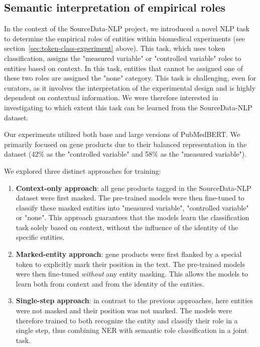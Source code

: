 \documentclass{bioinfo}
\begin{document}
\subsection{Semantic interpretation of empirical roles}\label{sec:results-roles}

In the context of the SourceData-NLP project, we introduced a novel NLP task to determine the empirical roles of entities within biomedical experiments (see section~\ref{sec:token-class-experiment} above). This task, which uses token classification, assigns the "measured variable" or "controlled variable" roles to entities based on context. In this task, entities that cannot be assigned one of these two roles are assigned the "none" category. This task is challenging, even for curators, as it involves the interpretation of the experimental design and is highly dependent on contextual information. We were therefore interested in investigating to which extent this task can be learned from the SourceData-NLP dataset.

Our experiments utilized both base and large versions of PubMedBERT. We primarily focused on gene products due to their balanced representation in the dataset (42\% as the "controlled variable" and 58\% as the "measured variable").

We explored three distinct approaches for training:
\begin{enumerate}
    \item\textbf{Context-only approach}: all gene products tagged in the SourceData-NLP dataset were first masked. The pre-trained models were then fine-tuned to classify these masked entities into "measured variable", "controlled variable" or "none". This approach guarantees that the models learn the classification task solely based on context, without the influence of the identity of the specific entities.
    \item \textbf{Marked-entity approach}: gene products were first flanked by a special token to explicitly mark their position in the text. The pre-trained models were then fine-tuned \textit{without} any entity masking. This allows the models to learn both from context and from the identity of the entities.
    \item \textbf{Single-step approach}: in contrast to the previous approaches, here entities were not masked and their position was not marked. The models were therefore trained to both recognize the entity and classify their role in a single step, thus combining NER with semantic role classification in a joint task.
\end{enumerate}
\end{document}
